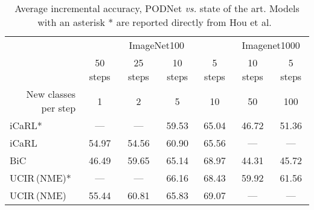 \begin{table*}[t]
    \caption{Average incremental accuracy, PODNet \textit{vs.} state of the art. Models with an asterisk * are reported directly from Hou et al.~\cite{hou2019ucir}}
    \label{tab:quantitative_imagenet}
    \centering
    \begin{tabular}{@{}l|cccc|cc@{}}
        \toprule
                                                      & \multicolumn{4}{c|}{ImageNet100} & \multicolumn{2}{c}{Imagenet1000}                                                                                                         \\
                                                      & 50 steps                         & 25 steps                         & 10 steps                         & 5 steps                          & 10 steps       & 5 steps        \\
        \multicolumn{1}{r|}{New classes per step}     & 1                                & 2                                & 5                                & 10                               & 50             & 100            \\
        \midrule
        iCaRL* \cite{rebuffi2017icarl}                & ---                              & ---                              & 59.53                            & 65.04                            & 46.72          & 51.36          \\
        iCaRL \cite{rebuffi2017icarl}                 & 54.97                            & 54.56                            & 60.90                            & 65.56                            & ---            & ---            \\
        BiC \cite{wu2019bias_correction}              & 46.49                            & 59.65                            & 65.14                            & 68.97                            & 44.31          & 45.72          \\
        UCIR\,{\scriptsize (NME)}* \cite{hou2019ucir} & ---                              & ---                              & 66.16                            & 68.43                            & 59.92          & 61.56          \\
        UCIR\,{\scriptsize (NME)} \cite{hou2019ucir}  & 55.44                            & 60.81                            & 65.83                            & 69.07                            & ---            & ---            \\

\end{tabular}
\end{table*}
